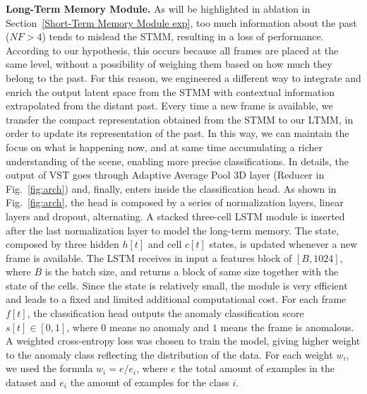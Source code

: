 \noindent\textbf{Long-Term Memory Module.}
\label{Long-Term Memory Module descr}
As will be highlighted in ablation in Section~\ref{Short-Term Memory Module exp}, too much information about the past ($\mathit{NF} > 4$) tends to mislead the STMM, resulting in a loss of performance.
According to our hypothesis, this occurs because all frames are placed at the same level, without a possibility of weighing them based on how much they belong to the past.
For this reason, we engineered a different way to integrate and enrich the output latent space from the STMM with contextual information extrapolated from the distant past.
Every time a new frame is available, we transfer the compact representation obtained from the STMM to our LTMM, in order to update its representation of the past.
In this way, we can maintain the focus on what is happening now, and at same time accumulating a richer understanding of the scene, enabling more precise classifications.
In details, the output of VST goes through Adaptive Average Pool 3D layer (Reducer in Fig.~\ref{fig:arch}) and, finally, enters inside the classification head.
As shown in Fig.~\ref{fig:arch}, the head is composed by a series of normalization layers, linear layers and dropout, alternating. 
A stacked three-cell LSTM module is inserted after the last normalization layer to model the long-term memory.
The state, composed by three hidden $h[t]$ and cell $c[t]$ states, is updated whenever a new frame is available.
The LSTM receives in input a features block of $[B, 1024]$, where $B$ is the batch size, and returns a block of same size together with the state of the cells.
Since the state is relatively small, the module is very efficient and leads to a fixed and limited additional computational cost.
For each frame $f[t]$, the classification head outputs the anomaly classification score $s[t] \in [0,1]$, where $0$ means no anomaly and $1$ means the frame is anomalous.
A weighted cross-entropy loss was chosen to train the model, giving higher weight to the anomaly class reflecting the distribution of the data.
For each weight $w_i$, we used the formula $w_i = e / e_i$, where $e$ the total amount of examples in the dataset and $e_i$ the amount of examples for the class $i$.

